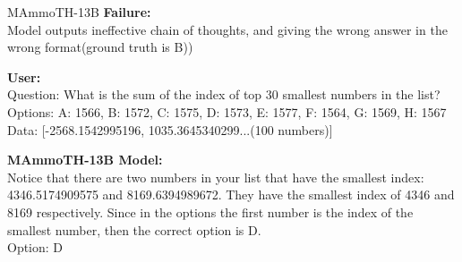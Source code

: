 	\begin{figure*}
	\begin{examplebox}{MAmmoTH-13B}
		\textbf{Failure:}\\ Model outputs ineffective chain of thoughts, and giving the wrong answer in the wrong format(ground truth is B))
		
		\vspace{0.2cm}
		\textbf{User:}\\ Question: What is the sum of the index of top 30 smallest numbers in the list? Options: A: 1566, B: 1572, C: 1575, D: 1573, E: 1577, F: 1564, G: 1569, H: 1567 Data: [-2568.1542995196, 1035.3645340299...(100 numbers)]
		
		\vspace{0.3cm}
		\textbf{MAmmoTH-13B Model:}\\  Notice that there are two numbers in your list that have the smallest index: 4346.5174909575 and 8169.6394989672. They have the smallest index of 4346 and 8169 respectively. Since in the options the first number is the index of the smallest number, then the correct option is D.\\             Option: D
	\end{examplebox}
	\caption{Failure type and conversation record of Mammoth-13B. The model fail to understand the problem's instruction, and does not provide reasonable output. Moreover, it provides the wrong answer in incorrect format, just like Metamath-Llemma-7B(We expect the model to provide the answer with a capital letter corresponding to the correct option).}
	\label{fig:fail_mammoth}
	\end{figure*}